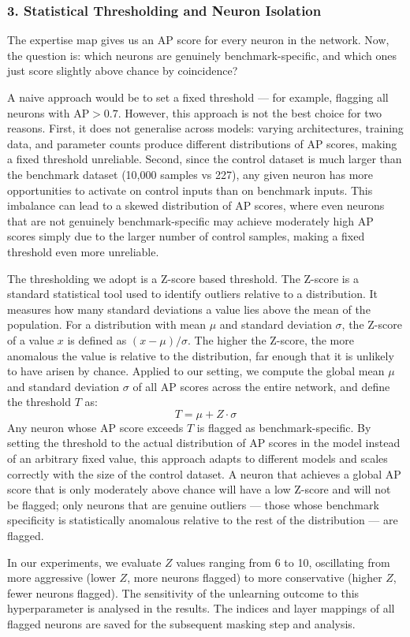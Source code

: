 \documentclass[mscthesis]{usiinfthesis}
\begin{document}
\subsubsection{3. Statistical Thresholding and Neuron Isolation}
The expertise map gives us an AP score for every neuron in the network. 
Now, the question is: which neurons are genuinely benchmark-specific, and which ones just score slightly
above chance by coincidence?
\par\vspace{1em}
A naive approach would be to set a fixed threshold --- for example, flagging all neurons with $\text{AP} > 0.7$. 
However, this approach is not the best choice for two reasons. 
First, it does not generalise across models: varying architectures, training data, and parameter counts produce different distributions of AP scores, making a fixed threshold unreliable.
Second, since the control dataset is much larger than the benchmark dataset (10,000 samples vs 227), any given neuron has more opportunities to activate on control inputs than on benchmark inputs.
This imbalance can lead to a skewed distribution of AP scores, where even neurons that are not genuinely benchmark-specific may achieve moderately high AP scores simply due to the larger number of control samples, making a fixed threshold even more unreliable.
\par\vspace{1em}
The thresholding we adopt is a Z-score based threshold. 
The Z-score is a standard statistical tool used to identify outliers relative to a distribution.
It measures how many standard deviations a value lies above the mean of the population. 
For a distribution with mean $\mu$ and standard deviation $\sigma$, the Z-score of a value $x$ is defined as $(x - \mu) / \sigma$.
The higher the Z-score, the more anomalous the value is relative to the distribution, far enough that it
is unlikely to have arisen by chance. Applied to our setting, we compute the global mean
$\mu$ and standard deviation $\sigma$ of all AP scores across the entire network, and define
the threshold $T$ as:
\[
  T = \mu + Z \cdot \sigma
\]
Any neuron whose AP score exceeds $T$ is flagged as benchmark-specific. 
By setting the threshold to the actual distribution of AP scores in the model instead of an arbitrary
fixed value, this approach adapts to different models and scales correctly with the size of the control dataset.
A neuron that achieves a global AP score that is only moderately above chance will have a low Z-score and will not be flagged; 
only neurons that are genuine outliers --- those whose benchmark specificity is statistically anomalous relative to the rest of the distribution --- are flagged.
\par\vspace{1em}
In our experiments, we evaluate $Z$ values ranging from 6 to 10, oscillating from more
aggressive (lower $Z$, more neurons flagged) to more conservative (higher $Z$, fewer
neurons flagged). The sensitivity of the unlearning outcome to this hyperparameter is
analysed in the results. The indices and layer mappings of all flagged neurons are saved for
the subsequent masking step and analysis.
 
\end{document}
